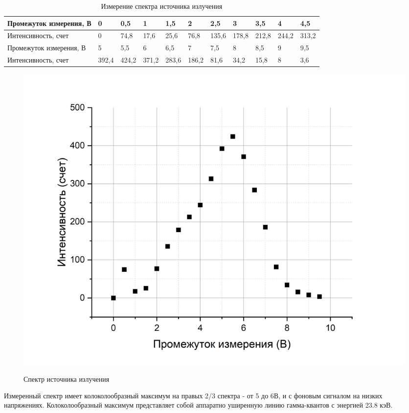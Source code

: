 \documentclass[a4paper,12pt]{article} %
\begin{document}
\begin{flushleft}
\begin{table}[h!]
\begin{tabular}{|l|l|l|l|l|l|l|l|l|l|l|}
\hline
Промежуток измерения, В & 0     & 0,5   & 1     & 1,5   & 2     & 2,5   & 3     & 3,5   & 4     & 4,5   \\ \hline
Интенсивность, счет     & 0     & 74,8  & 17,6  & 25,6  & 76,8  & 135,6 & 178,8 & 212,8 & 244,2 & 313,2 \\ \hline
Промежуток измерения, В & 5     & 5,5   & 6     & 6,5   & 7     & 7,5   & 8     & 8,5   & 9     & 9,5   \\ \hline
Интенсивность, счет     & 392,4 & 424,2 & 371,2 & 283,6 & 186,2 & 81,6  & 34,2  & 15,8  & 8     & 3,6   \\ \hline
\end{tabular}
\label{tab}
\caption{Измерение спектра источника излучения}
\end{table}
\end{flushleft}

\begin{figure}[h!]
\begin{center}
\includegraphics[scale=0.6]{spectrum.png}
\label{spectrum}
\caption{Спектр источника излучения}

\end{center}
\end{figure}

\noindent Измеренный спектр имеет колоколообразный максимум на правых 2/3 спектра - от 5 до 6В, и с фоновым сигналом на низких напряжениях. Колоколообразный максимум представляет собой аппаратно уширенную линию гамма-квантов с энергией 23.8 кэВ.\\
\end{document}
